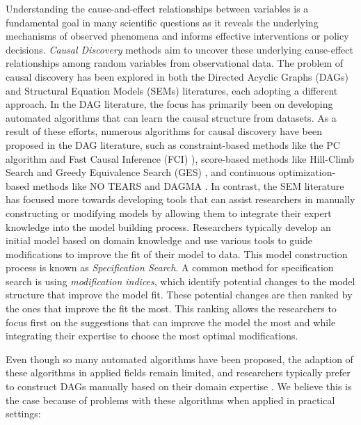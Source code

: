 \documentclass[letterpaper]{article} %
\begin{document}
Understanding the cause-and-effect relationships between variables is a
fundamental goal in many scientific questions as it reveals the underlying
mechanisms of observed phenomena and informs effective interventions or policy
decisions. \emph{Causal Discovery} methods aim to uncover these underlying
cause-effect relationships among random variables from observational data. The
problem of causal discovery has been explored in both the Directed Acyclic
Graphs (DAGs) and Structural Equation Models (SEMs) literatures, each adopting
a different approach. In the DAG literature, the focus has primarily been on
developing automated algorithms that can learn the causal structure from
datasets. As a result of these efforts, numerous algorithms for causal
discovery have been proposed in the DAG literature, such as constraint-based
methods like the PC algorithm \citep{Spirtes2001} and Fast Causal Inference
(FCI) \citep{Spirtes2000}), score-based methods like Hill-Climb Search and
Greedy Equivalence Search (GES) \citep{Chickering2002}, and continuous
optimization-based methods like NO TEARS \citep{Zheng2018} and DAGMA
\citep{Bello2022}. In contrast, the SEM literature has focused more towards
developing tools that can assist researchers in manually constructing or
modifying models by allowing them to integrate their expert knowledge into the
model building process. Researchers typically develop an initial model based on
domain knowledge and use various tools to guide modifications to improve the
fit of their model to data. This model construction process is known as
\emph{Specification Search}. A common method for specification search is using
\emph{modification indices}, which identify potential changes to the model
structure that improve the model fit. These potential changes are then ranked
by the ones that improve the fit the most. This ranking allows the researchers
to focus first on the suggestions that can improve the model the most and while
integrating their expertise to choose the most optimal modifications.

Even though so many automated algorithms have been proposed, the adaption of
these algorithms in applied fields remain limited, and researchers typically
prefer to construct DAGs manually based on their domain expertise
\citep{Tennant2020, Petersen2021}. We believe this is the case because of
problems with these algorithms when applied in practical settings:
\end{document}
